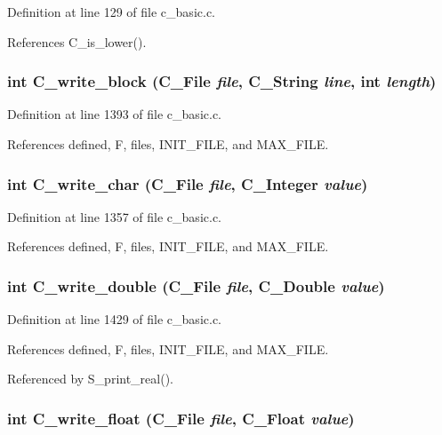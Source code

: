 Definition at line 129 of file c\_\-basic.c.

References C\_\-is\_\-lower().
\subsubsection{\setlength{\rightskip}{0pt plus 5cm}int C\_\-write\_\-block (\bf{C\_\-File} {\em file}, \bf{C\_\-String} {\em line}, int {\em length})}\label{c__basic_8h_2f6edac31d6e2a9411525563dcc32e0b}




Definition at line 1393 of file c\_\-basic.c.

References defined, F, files, INIT\_\-FILE, and MAX\_\-FILE.
\subsubsection{\setlength{\rightskip}{0pt plus 5cm}int C\_\-write\_\-char (\bf{C\_\-File} {\em file}, \bf{C\_\-Integer} {\em value})}\label{c__basic_8h_2b2dfd94e2065f0c0abc67de22f84576}




Definition at line 1357 of file c\_\-basic.c.

References defined, F, files, INIT\_\-FILE, and MAX\_\-FILE.
\subsubsection{\setlength{\rightskip}{0pt plus 5cm}int C\_\-write\_\-double (\bf{C\_\-File} {\em file}, \bf{C\_\-Double} {\em value})}\label{c__basic_8h_60d6e926e0dd64a162327c233d3ed481}




Definition at line 1429 of file c\_\-basic.c.

References defined, F, files, INIT\_\-FILE, and MAX\_\-FILE.

Referenced by S\_\-print\_\-real().
\subsubsection{\setlength{\rightskip}{0pt plus 5cm}int C\_\-write\_\-float (\bf{C\_\-File} {\em file}, \bf{C\_\-Float} {\em value})}\label{c__basic_8h_e968b8e21a15ed10bd9703c0f9415790}




